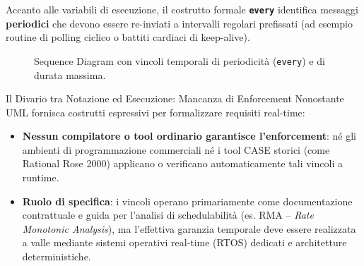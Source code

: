 \documentclass[12pt]{extarticle}
\begin{document}
\noindent Accanto alle variabili di esecuzione, il costrutto formale \textbf{\texttt{every}} identifica messaggi \textbf{periodici} che devono essere re-inviati a intervalli regolari prefissati (ad esempio routine di polling ciclico o battiti cardiaci di keep-alive).

\begin{figure}[htbp]
\centering
{}
\caption{Sequence Diagram con vincoli temporali di periodicità (\texttt{every}) e di durata massima.}
\label{fig:sequence_timing_constraints}
\end{figure}

\begin{cbox}{Il Divario tra Notazione ed Esecuzione: Mancanza di Enforcement}
\noindent Nonostante UML fornisca costrutti espressivi per formalizzare requisiti real-time:
\begin{itemize}
    \item \textbf{Nessun compilatore o tool ordinario garantisce l'enforcement}: né gli ambienti di programmazione commerciali né i tool CASE storici (come Rational Rose 2000) applicano o verificano automaticamente tali vincoli a runtime.
    \item \textbf{Ruolo di specifica}: i vincoli operano primariamente come documentazione contrattuale e guida per l'analisi di schedulabilità (es. RMA -- \textit{Rate Monotonic Analysis}), ma l'effettiva garanzia temporale deve essere realizzata a valle mediante sistemi operativi real-time (RTOS) dedicati e architetture deterministiche.
\end{itemize}
\end{cbox}
\end{document}
